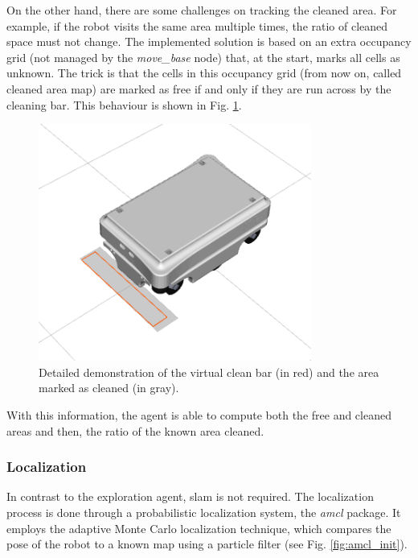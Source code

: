 \documentclass[]{article}
\begin{document}
On the other hand, there are some challenges on tracking the cleaned area. For example, if the robot visits the same area multiple times, the ratio of cleaned space must not change. The implemented solution is based on an extra occupancy grid (not managed by the \textit{move\_base} node) that, at the start, marks all cells as unknown. The trick is that the cells in this occupancy grid (from now on, called cleaned area map) are marked as free if and only if they are run across by the cleaning bar. This behaviour is shown in Fig. \ref{fig:clean_bar_mapping}.

\begin{figure}[ht]
    \centering
    \includegraphics[width=0.8\textwidth]{imgs/clean_bar_mapping.png}
    \caption{Detailed demonstration of the virtual clean bar (in red) and the area marked as cleaned (in gray).}
    \label{fig:clean_bar_mapping}
\end{figure}

With this information, the agent is able to compute both the free and cleaned areas and then, the ratio of the known area cleaned.

\subsubsection{Localization}

In contrast to the exploration agent, \gls{slam} is not required. The localization process is done through a probabilistic localization system, the \textit{amcl} package. It employs the adaptive Monte Carlo localization technique, which compares the pose of the robot to a known map using a particle filter (see Fig. \ref{fig:amcl_init}).
\end{document}
